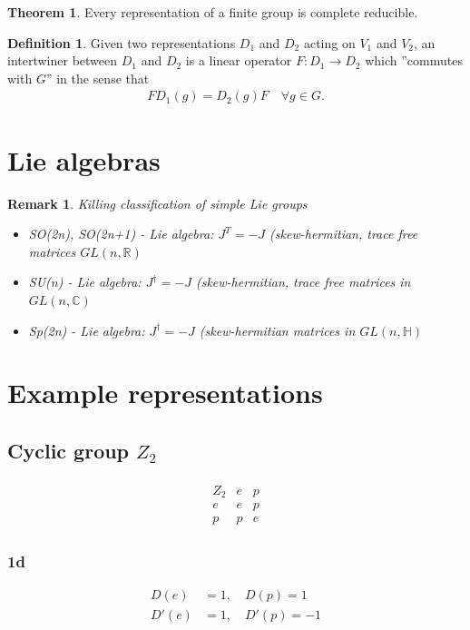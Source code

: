 \documentclass[10pt,a4paper]{article}
\newtheorem{remark}{Remark}[section]
\theoremstyle{definition}
\newtheorem{definition}{Definition}[section]
\newtheorem{theorem}{Theorem}[section]
\begin{document}
\begin{theorem}
Every representation of a finite group is complete reducible.
\end{theorem}

\begin{definition}{}
Given two representations $D_1$ and $D_2$ acting on $V_1$ and $V_2$, an intertwiner between $D_1$ and $D_2$ is a linear operator $F:D_1\rightarrow D_2$ which ''commutes with $G$'' in the sense that
\begin{align}
F D_1(g) = D_2(g)F\quad \forall g \in G. 
\end{align}
\end{definition}



\section{Lie algebras}

\begin{remark}{}
Killing classification of simple Lie groups
\begin{itemize}
    \item SO(2n), SO(2n+1) - Lie algebra: $J^T=-J$ (skew-hermitian, trace free matrices $GL(n,\mathbb{R})$
    \item SU(n) - Lie algebra: $J^\dagger=-J$ (skew-hermitian, trace free matrices in $GL(n,\mathbb{C})$
    \item Sp(2n) - Lie algebra: $J^\dagger=-J$ (skew-hermitian matrices in $GL(n,\mathbb{H})$
\end{itemize}
\end{remark}

\section{Example representations}
\subsection{Cyclic group $Z_2$}
\begin{align}
\begin{array}{c||cc}
Z_2 & e & p \\ \hline\hline
e & e & p \\
p & p & e
\end{array}
\end{align}
\subsubsection{1d}
\begin{align}
D(e)&=1,\quad D(p)=1\\
D'(e)&=1,\quad D'(p)=-1
\end{align}
\end{document}

